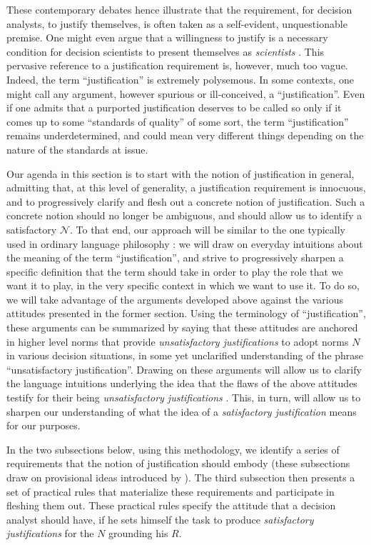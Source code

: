 \documentclass[preprint, french, english, 11pt, authoryear]{elsarticle}%
\newcommand{\commentOCf}[1]{\textcolor{red}{\selectlanguage{french}{OC : #1}}}
\newcommand{\adv}{\mathscr{N}}
\begin{document}
These contemporary debates hence illustrate that the requirement, for decision analysts, to justify themselves, is often taken as a self-evident, unquestionable premise. One might even argue that a willingness to justify is a necessary condition for decision scientists to present themselves as \emph{scientists} \citep{ormerod_justifying_2010}. This pervasive reference to a justification requirement is, however, much too vague. Indeed, the term ``justification'' is extremely polysemous. In some contexts, one might call any argument, however spurious or ill-conceived, a ``justification''. Even if one admits that a purported justification deserves to be called so only if it comes up to some ``standards of quality'' of some sort, the term ``justification'' remains underdetermined, and could mean very different things depending on the nature of the standards at issue.

Our agenda in this section is to start with the notion of justification in general, admitting that, at this level of generality, a justification requirement is innocuous, and to progressively clarify and flesh out a concrete notion of justification. Such a concrete notion should no longer be ambiguous, and should allow us to identify a satisfactory $\adv$. To that end, our approach will be similar to the one typically used in ordinary language philosophy \citep{soames_philosophical_2003}: we will draw on everyday intuitions about the meaning of the term ``justification'', and strive to progressively sharpen a specific definition that the term should take in order to play the role that we want it to play, in the very specific context in which we want to use it. To do so, we will take advantage of the arguments developed above against the various attitudes presented in the former section. Using the terminology of ``justification'', these arguments can be summarized by saying that these attitudes are anchored in higher level norms that provide \emph{unsatisfactory justifications} to adopt norms $N$ in various decision situations, in some yet unclarified understanding of the phrase ``unsatisfactory justification''. Drawing on these arguments will allow us to clarify the language intuitions underlying the idea that the flaws of the above attitudes testify for their being \emph{unsatisfactory justifications} \commentOCf{Je ne comprends pas cette phrase.}. This, in turn, will allow us to sharpen our understanding of what the idea of a \emph{satisfactory justification} means for our purposes.

In the two subsections below, using this methodology, we identify a series of requirements that the notion of justification should embody (these subsections draw on provisional ideas introduced by \citet{meinard_du_2013, meinard_what_2017}). The third subsection then presents a set of practical rules that materialize these requirements and participate in fleshing them out. These practical rules specify the attitude that a decision analyst should have, if he sets himself the task to produce \emph{satisfactory justifications} for the $N$ grounding his $R$.
\end{document}
